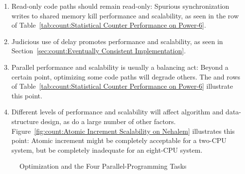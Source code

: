 \begin{enumerate}
\begin{enumerate}
\item	Read-only code paths should remain read-only:  Spurious
	synchronization writes to shared memory kill performance
	and scalability, as seen in the  row of
	Table~\ref{tab:count:Statistical Counter Performance on Power-6}.
\item	Judicious use of delay promotes performance and scalability, as
	seen in Section~\ref{sec:count:Eventually Consistent Implementation}.
\item	Parallel performance and scalability is usually a balancing act:
	Beyond a certain point, optimizing some code paths will degrade
	others.
	The  and  rows of
	Table~\ref{tab:count:Statistical Counter Performance on Power-6}
	illustrate this point.
\item	Different levels of performance and scalability will affect
	algorithm and data-structure design, as do a large number of
	other factors.
	Figure~\ref{fig:count:Atomic Increment Scalability on Nehalem}
	illustrates this point:  Atomic increment might be completely
	acceptable for a two-CPU system, but be completely inadequate for an
	eight-CPU system.
\fi
\end{enumerate}

\begin{figure}[tb]
\centering
{}
\caption{Optimization and the Four Parallel-Programming Tasks}
\label{fig:count:Optimization and the Four Parallel-Programming Tasks}
\end{figure}


\end{enumerate}
